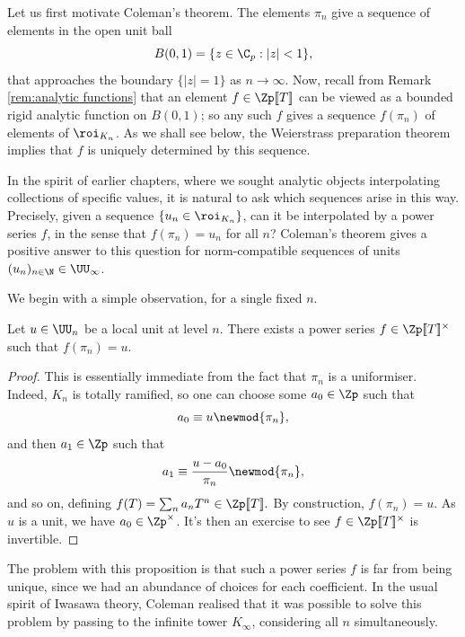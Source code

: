 \documentclass[a4paper,10pt, english, reqno]{smfart}
\newcommand{\lsem}{[\! [}
\newcommand{\rsem}{]\! ]}
\numberwithin{equation}{section}
\begin{document}
Let us first motivate Coleman's theorem. The elements $\pi_n$ give a sequence of elements in the open unit ball 
\[
B(0,1) = \{z \in \C_p : |z|<1\},
\]
that approaches the boundary $\{|z| = 1\}$ as $n\to \infty$. Now, recall from Remark \ref{rem:analytic functions} that an element $f \in \Zp\lsem T\rsem$ can be viewed as a bounded rigid analytic function on $B(0,1)$; so any such $f$ gives a sequence $f(\pi_n)$ of elements of $\roi_{K_n}$. As we shall see below, the Weierstrass preparation theorem implies that $f$ is uniquely determined by this sequence. 

In the spirit of earlier chapters, where we sought analytic objects interpolating collections of specific values, it is natural to ask which sequences arise in this way. Precisely, given a sequence $\{u_n \in \roi_{K_n}\}$, can it be interpolated by a power series $f$, in the sense that $f(\pi_n) = u_n$ for all $n$? Coleman's theorem gives a positive answer to this question for norm-compatible sequences of units $(u_n)_{n \in \N} \in \UU_\infty$.

We begin with a simple observation, for a single fixed $n$.

\begin{lemma}
Let $u \in \UU_n$ be a local unit at level $n$. There exists a power series $f \in \Zp\lsem T\rsem^\times$ such that $f(\pi_n) = u.$
\end{lemma}
\begin{proof}
This is essentially immediate from the fact that $\pi_n$ is a uniformiser. Indeed, $K_n$ is totally ramified, so one can choose some $a_0 \in \Zp$ such that
\[a_0 \equiv u \newmod{\pi_n},\]
and then $a_1 \in \Zp$ such that
\[a_1 \equiv \frac{u - a_0}{\pi_n} \newmod{\pi_n},\]
and so on, defining $f(T) = \sum_n a_n T^n \in \Zp\lsem T\rsem.$ By construction, $f(\pi_n) = u$.  As $u$ is a unit, we have $a_0 \in \Zp^\times$. It's then an exercise to see $f \in \Zp\lsem T\rsem^\times$ is invertible.
\end{proof}



The problem with this proposition is that such a power series $f$ is far from being unique, since we had an abundance of choices for each coefficient. In the usual spirit of Iwasawa theory, Coleman realised that it was possible to solve this problem by passing to the infinite tower $K_\infty$, considering all $n$ simultaneously. %
\end{document}
